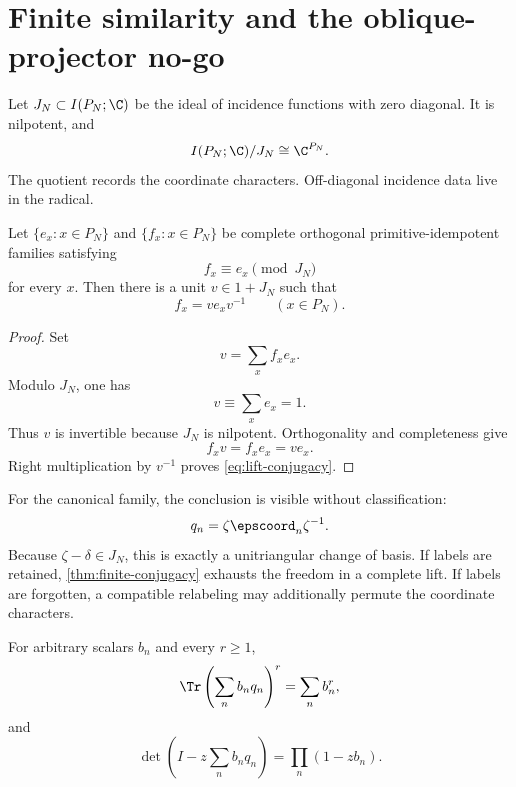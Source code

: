 \section{Finite similarity and the oblique-projector no-go}
\label{sec:similarity}

Let \(J_N\subset I(P_N;\C)\) be the ideal of incidence functions with zero
diagonal. It is nilpotent, and
\begin{equation}
I(P_N;\C)/J_N\cong\C^{P_N}.
\label{eq:incidence-semisimple}
\end{equation}
The quotient records the coordinate characters. Off-diagonal incidence data
live in the radical.

\begin{theorem}
\label{thm:finite-conjugacy}
Let \(\{e_x:x\in P_N\}\) and \(\{f_x:x\in P_N\}\) be complete orthogonal
primitive-idempotent families satisfying
\[
f_x\equiv e_x\pmod{J_N}
\]
for every \(x\). Then there is a unit \(v\in1+J_N\) such that
\begin{equation}
f_x=ve_xv^{-1}\qquad(x\in P_N).
\label{eq:lift-conjugacy}
\end{equation}
\end{theorem}

\begin{proof}
Set
\[
v=\sum_x f_xe_x.
\]
Modulo \(J_N\), one has
\[
v\equiv\sum_x e_x=1.
\]
Thus \(v\) is invertible because \(J_N\) is nilpotent. Orthogonality and
completeness give
\[
f_xv=f_xe_x=ve_x.
\]
Right multiplication by \(v^{-1}\) proves \eqref{eq:lift-conjugacy}.
\end{proof}

For the canonical family, the conclusion is visible without classification:
\begin{equation}
q_n=\zeta\epscoord_n\zeta^{-1}.
\label{eq:canonical-conjugacy}
\end{equation}
Because \(\zeta-\delta\in J_N\), this is exactly a unitriangular change of
basis. If labels are retained, \cref{thm:finite-conjugacy} exhausts the
freedom in a complete lift. If labels are forgotten, a compatible relabeling
may additionally permute the coordinate characters.

\begin{corollary}
\label{cor:finite-determinant}
For arbitrary scalars \(b_n\) and every \(r\ge1\),
\begin{equation}
\Tr\left(\sum_n b_nq_n\right)^r=\sum_n b_n^r,
\label{eq:finite-power-trace}
\end{equation}
and
\begin{equation}
\det\left(I-z\sum_n b_nq_n\right)=\prod_n(1-zb_n).
\label{eq:finite-determinant}
\end{equation}
\end{corollary}

